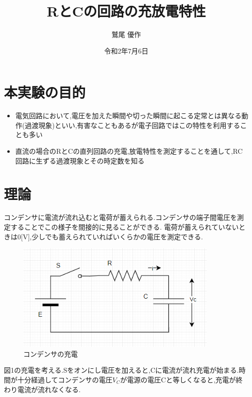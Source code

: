\documentclass[titlepage]{jarticle}
\title{RとCの回路の充放電特性}
\author{鷲尾 優作}
\date{令和2年7月6日}
\begin{document}
\maketitle

\section{本実験の目的}
\begin{itemize}
    \item 電気回路において,電圧を加えた瞬間や切った瞬間に起こる定常とは異なる動作(過渡現象)といい,有害なこともあるが電子回路ではこの特性を利用することも多い
    \item 直流の場合のRとCの直列回路の充電,放電特性を測定することを通して,RC回路に生ずる過渡現象とその時定数を知る
\end{itemize}

\section{理論}
コンデンサに電流が流れ込むと電荷が蓄えられる.コンデンサの端子間電圧を測定することでこの様子を間接的に見ることができる.
電荷が蓄えられていないときは0[V],少しでも蓄えられていればいくらかの電圧を測定できる.\\
\begin{figure}[H]
    \begin{center}
        \includegraphics[width=10cm]{image/1.png}
        \caption{コンデンサの充電}
    \end{center}
\end{figure}

図1の充電を考える.Sをオンにし電圧を加えると,Cに電流が流れ充電が始まる.時間が十分経過してコンデンサの電圧$V_C$が電源の電圧Cと等しくなると,充電が終わり電流が流れなくなる.\\
\end{document}
